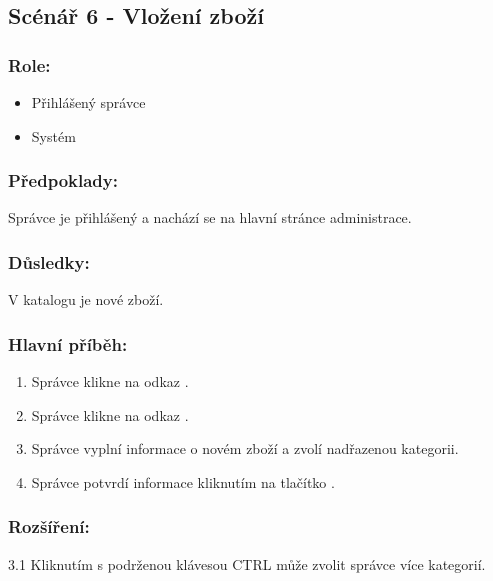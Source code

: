 \documentclass[11pt,twoside,a4paper]{book}
\begin{document}
\subsection{Scénář 6 - Vložení zboží}

\subsubsection*{Role:}

\begin{itemize}
\item Přihlášený správce
\item Systém
\end{itemize}

\subsubsection*{Předpoklady:}

Správce je přihlášený a nachází se na hlavní stránce administrace.

\subsubsection*{Důsledky:}

V katalogu je nové zboží.

\subsubsection*{Hlavní příběh:}

\begin{enumerate}
\item Správce klikne na odkaz .
\item Správce klikne na odkaz .
\item Správce vyplní informace o novém zboží a zvolí nadřazenou kategorii.
\item Správce potvrdí informace kliknutím na tlačítko .
\end{enumerate}

\subsubsection*{Rozšíření:}

\begin{description}
\item  3.1 Kliknutím s podrženou klávesou CTRL může zvolit správce více kategorií.
\end{description}
\end{document}
